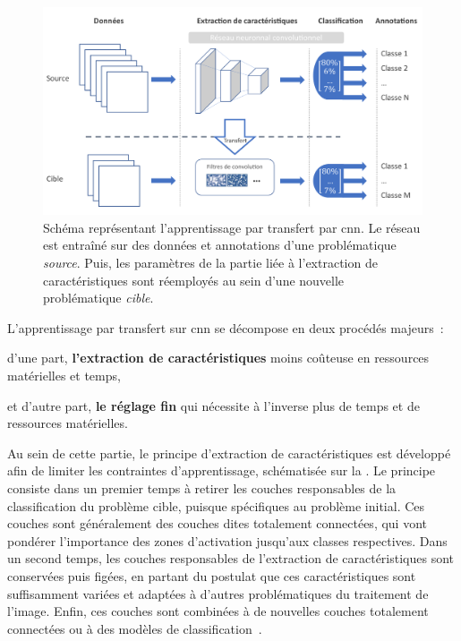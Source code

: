 \begin{figure}[H]
    \centering
    \includegraphics[width=\linewidth]{contents/chapter_5/resources/scheme_transfer_learning.pdf}
    \caption{Schéma représentant l'apprentissage par transfert par \gls{cnn}. Le réseau est entraîné sur des données et annotations d'une problématique \textit{source}. Puis, les paramètres de la partie liée à l'extraction de caractéristiques sont réemployés au sein d'une nouvelle problématique \textit{cible}.}
    \label{fig:scheme_transfer_learning}
\end{figure}\par

L'apprentissage par transfert sur \gls{cnn} se décompose en deux procédés majeurs~: 
\begin{inlinerate}
    \item d'une part, \textbf{l'extraction de caractéristiques} moins coûteuse en ressources matérielles et temps,
    \item et d'autre part, \textbf{le réglage fin} qui nécessite à l'inverse plus de temps et de ressources matérielles. 
\end{inlinerate}
Au sein de cette partie, le principe d'extraction de caractéristiques est développé afin de limiter les contraintes d'apprentissage, schématisée sur la . Le principe consiste dans un premier temps à retirer les couches responsables de la classification du problème cible, puisque spécifiques au problème initial. Ces couches sont généralement des couches dites totalement connectées, qui vont pondérer l'importance des zones d'activation jusqu'aux classes respectives. Dans un second temps, les couches responsables de l'extraction de caractéristiques sont conservées puis figées, en partant du postulat que ces caractéristiques sont suffisamment variées et adaptées à d'autres problématiques du traitement de l'image. Enfin, ces couches sont combinées à de nouvelles couches totalement connectées ou à des modèles de classification~\cite{Litjens2017}.\par 

